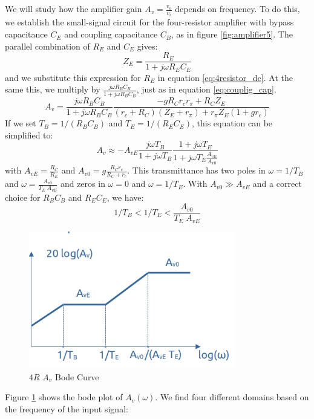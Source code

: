 We will study how the amplifier gain $A_v = \frac{v_o}{v_i}$ depends on frequency. To do this, we establish the small-signal circuit for the four-resistor amplifier with bypass capacitance $C_E$ and coupling capacitance $C_B$, as in figure \ref{fig:amplifier5}. The parallel combination of $R_E$ and $C_E$ gives:
\begin{equation}
	Z_E = \frac{R_E}{1 + j \omega R_E C_E}
\end{equation}
and we substitute this expression for $R_E$ in equation \ref{eq:4resistor_dc}. At the same this, we multiply by $\frac{j\omega R_B C_B}{1+j\omega R_B C_B} $, just as in equation \ref{eq:couplig_cap}. 
\begin{equation}
	A_v = \frac{j\omega R_B C_B}{1+j\omega R_B C_B} \frac{-g R_C r_c r_{\pi} + R_C Z_E}{(r_c + R_C)(Z_E + r_{\pi}) + r_{\pi} Z_E(1 + g r_c)}
\end{equation}
If we set $T_B = 1/(R_B C_B)$ and $T_E = 1/(R_E C_E)$, this equation can be simplified to:
\begin{equation}
	A_v \approx -  A_{vE} \frac{j \omega T_B}{1 + j \omega T_B} \frac{1 + j \omega T_E}{1 + j \omega T_E    \frac{A_{vE}}{A_{v0}} } 
\end{equation}
with $A_{vE} = \frac{R_C}{R_E}$ and $A_{v0} = g \frac{R_C r_c}{R_C + r_c}$. This transmittance has two poles in $\omega=1/T_B$ and $\omega = \frac{A_{v0}}{T_E \; A_{vE}}$ and zeros in $\omega=0$ and $\omega = 1/T_E$. With $A_{v0} \gg A_{vE}$ and a correct choice for $R_B C_B$ and $R_E C_E$, we have:
$$1/T_B < 1/T_E < \frac{A_{v0}}{T_E \; A_{vE}}$$
\begin{figure}[h!]
	\centering
	\includegraphics[width=9cm]{figures/ch02/amplifier6.jpg}
	\caption{$4R$ $A_v$ Bode Curve}
	\label{fig:amplifier6}
\end{figure}
Figure \ref{fig:amplifier6} shows the bode plot of $A_v(\omega)$. We find four different domains based on the frequency of the input signal:
